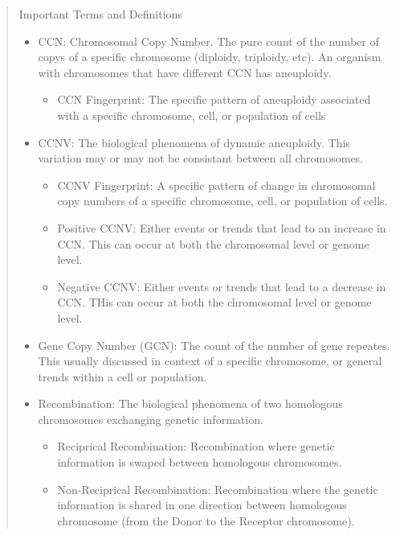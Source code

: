 \documentclass{article}
\begin{document}
\begin{abstract}
        \begin{large}
            Important Terms and Definitions
        \end{large}
        \begin{itemize}
            \item CCN: Chromosomal Copy Number.  The pure count of the number of copys of a specific chromosome (diploidy, triploidy, etc).  An organism with chromosomes that have different CCN has aneuploidy.
                \begin{itemize}
                    \item CCN Fingerprint: The specific pattern of aneuploidy associated with a specific chromosome, cell, or population of cells
                \end{itemize}
            \item CCNV:  The biological phenomena of dynamic aneuploidy.  This variation may or may not be consistant between all chromosomes.
                \begin{itemize}
                    \item CCNV Fingerprint: A specific pattern of change in chromosomal copy numbers of a specific chromosome, cell, or population of cells.
                    \item Positive CCNV: Either events or trends that lead to an increase in CCN.  This can occur at both the chromosomal level or genome level.
                    \item Negative CCNV: Either events or trends that lead to a decrease in CCN.  THis can occur at both the chromosomal level or genome level.
            \end{itemize}
            \item Gene Copy Number (GCN):  The count of the number of gene repeates.  This usually discussed in context of a specific chromosome, or general trends within a cell or population.
            \item Recombination: The biological phenomena of two homologous chromosomes exchanging genetic information.
                \begin{itemize}
                    \item Reciprical Recombination: Recombination where genetic information is swaped between homologous chromosomes.
                    \item Non-Reciprical Recombination: Recombination where the genetic information is shared in one direction between homologous chromosome (from the Donor to the Receptor chromosome).

\end{itemize}
\end{itemize}
\end{abstract}
\end{document}
